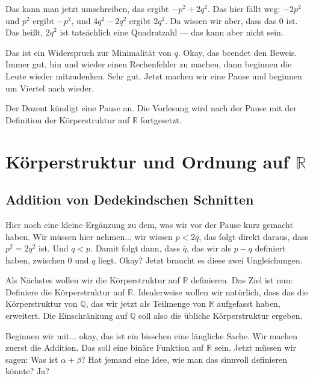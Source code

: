 \begin{spoken-clean}[00:48:12 - 00:50:42]
Das kann man jetzt umschreiben, das ergibt $-p^2 + 2q^2$. Das hier fällt weg: $-2p^2$ und $p^2$ ergibt $-p^2$, und $4q^2 - 2q^2$ ergibt $2q^2$. Da wissen wir aber, dass das $0$ ist. Das heißt, $2\bar{q}^2$ ist tatsächlich eine Quadratzahl --- das kann aber nicht sein. 

Das ist ein Widerspruch zur Minimalität von $q$. Okay, das beendet den Beweis. Immer gut, hin und wieder einen Rechenfehler zu machen, dann beginnen die Leute wieder mitzudenken. Sehr gut. Jetzt machen wir eine Pause und beginnen um Viertel nach wieder.
\end{spoken-clean}

\begin{lecture-break}[Pause]
Der Dozent kündigt eine Pause an. Die Vorlesung wird nach der Pause mit der Definition der Körperstruktur auf $\mathbb{R}$ fortgesetzt.
\end{lecture-break}

\section{Körperstruktur und Ordnung auf \texorpdfstring{$\mathbb{R}$}{R}}

\subsection{Addition von Dedekindschen Schnitten}

\begin{spoken-clean}[00:50:42 - 00:53:12]
Hier noch eine kleine Ergänzung zu dem, was wir vor der Pause kurz gemacht haben. Wir müssen hier nehmen... wir wissen $p < 2q$, das folgt direkt daraus, dass $p^2 = 2q^2$ ist. Und $q < p$. Damit folgt dann, dass $\bar{q}$, das wir als $p - q$ definiert haben, zwischen $0$ und $q$ liegt. Okay? Jetzt braucht es diese zwei Ungleichungen.

Als Nächstes wollen wir die Körperstruktur auf $\mathbb{R}$ definieren. Das Ziel ist nun: Definiere die Körperstruktur auf $\mathbb{R}$. Idealerweise wollen wir natürlich, dass das die Körperstruktur von $\mathbb{Q}$, das wir jetzt als Teilmenge von $\mathbb{R}$ aufgefasst haben, erweitert. Die Einschränkung auf $\mathbb{Q}$ soll also die übliche Körperstruktur ergeben.

Beginnen wir mit... okay, das ist ein bisschen eine längliche Sache. Wir machen zuerst die Addition. Das soll eine binäre Funktion auf $\mathbb{R}$ sein. Jetzt müssen wir sagen: Was ist $\alpha + \beta$? Hat jemand eine Idee, wie man das sinnvoll definieren könnte? Ja?
\end{spoken-clean}

